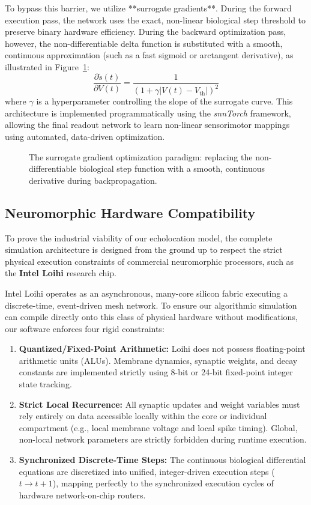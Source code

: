 To bypass this barrier, we utilize **surrogate gradients**. During the forward execution pass, the network uses the exact, non-linear biological step threshold to preserve binary hardware efficiency. During the backward optimization pass, however, the non-differentiable delta function is substituted with a smooth, continuous approximation (such as a fast sigmoid or arctangent derivative), as illustrated in Figure~\ref{fig:surrogate_gradient}:
\begin{equation}
    \frac{\partial \tilde{s}(t)}{\partial V(t)} = \frac{1}{\left(1 + \gamma |V(t) - V_{\text{th}}|\right)^2}
\end{equation}
where $\gamma$ is a hyperparameter controlling the slope of the surrogate curve. This architecture is implemented programmatically using the \textit{snnTorch} framework, allowing the final readout network to learn non-linear sensorimotor mappings using automated, data-driven optimization.

\begin{figure}[htbp]
    \centering
    \caption{The surrogate gradient optimization paradigm: replacing the non-differentiable biological step function with a smooth, continuous derivative during backpropagation.}
    \label{fig:surrogate_gradient}
\end{figure}

\subsection{Neuromorphic Hardware Compatibility}
To prove the industrial viability of our echolocation model, the complete simulation architecture is designed from the ground up to respect the strict physical execution constraints of commercial neuromorphic processors, such as the \textbf{Intel Loihi} research chip.

Intel Loihi operates as an asynchronous, many-core silicon fabric executing a discrete-time, event-driven mesh network. To ensure our algorithmic simulation can compile directly onto this class of physical hardware without modifications, our software enforces four rigid constraints:
\begin{enumerate}
    \item \textbf{Quantized/Fixed-Point Arithmetic:} Loihi does not possess floating-point arithmetic units (ALUs). Membrane dynamics, synaptic weights, and decay constants are implemented strictly using 8-bit or 24-bit fixed-point integer state tracking.
    \item \textbf{Strict Local Recurrence:} All synaptic updates and weight variables must rely entirely on data accessible locally within the core or individual compartment (e.g., local membrane voltage and local spike timing). Global, non-local network parameters are strictly forbidden during runtime execution.
    \item \textbf{Synchronized Discrete-Time Steps:} The continuous biological differential equations are discretized into unified, integer-driven execution steps ($t \to t+1$), mapping perfectly to the synchronized execution cycles of hardware network-on-chip routers.
\end{enumerate}


